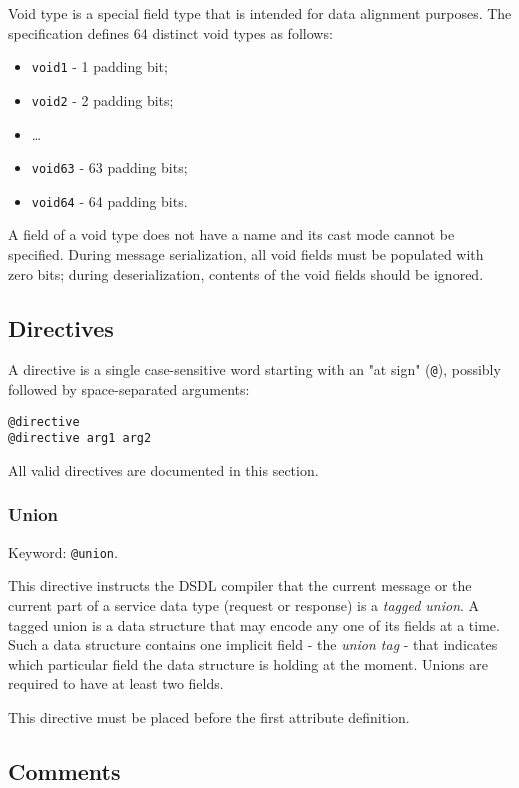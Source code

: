 Void type is a special field type that is intended for data alignment purposes.
The specification defines 64 distinct void types as follows:

\begin{itemize}
    \item \verb|void1| - 1 padding bit;
    \item \verb|void2| - 2 padding bits;
    \item \ldots
    \item \verb|void63| - 63 padding bits;
    \item \verb|void64| - 64 padding bits.
\end{itemize}

A field of a void type does not have a name and its cast mode cannot be specified.
During message serialization, all void fields must be populated with zero bits;
during deserialization, contents of the void fields should be ignored.

\subsection{Directives}

A directive is a single case-sensitive word starting with an "at sign" (\verb|@|),
possibly followed by space-separated arguments:

\begin{verbatim}
@directive
@directive arg1 arg2
\end{verbatim}

All valid directives are documented in this section.

\subsubsection{Union}

Keyword: \verb|@union|.

This directive instructs the DSDL compiler that the current message or the current part of a service data type
(request or response) is a \emph{tagged union}.
A tagged union is a data structure that may encode any one of its fields at a time.
Such a data structure contains one implicit field - the \emph{union tag} - that indicates which particular
field the data structure is holding at the moment.
Unions are required to have at least two fields.

This directive must be placed before the first attribute definition.

\subsection{Comments}


